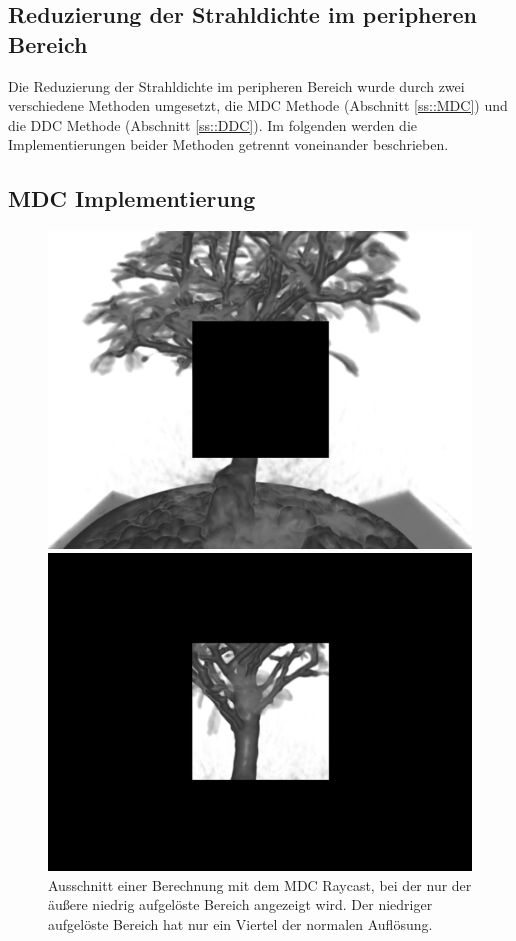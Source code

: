 \subsection{Reduzierung der Strahldichte im peripheren Bereich}
Die Reduzierung der Strahldichte im peripheren Bereich wurde durch zwei verschiedene Methoden umgesetzt, die MDC Methode (Abschnitt \ref{ss::MDC}) und die DDC Methode (Abschnitt \ref{ss::DDC}).
Im folgenden werden die Implementierungen beider Methoden getrennt voneinander beschrieben.

\subsection{MDC Implementierung}
\begin{figure}[]
	\centering
	\begin{minipage}[t]{0.49\textwidth}
		\centering
		\includegraphics[width=1\textwidth]{../../Grafiken/results/implementierung/mdc_ol.png}
		\caption{Ausschnitt einer Berechnung mit dem MDC Raycast, bei der nur der äußere niedrig aufgelöste Bereich angezeigt wird. Der niedriger aufgelöste Bereich hat nur ein Viertel der normalen Auflösung.}
		\label{fig::imp::mdc_ol}
	\end{minipage}
	\hfill
	\begin{minipage}[t]{0.49\textwidth}
		\centering
		\includegraphics[width=1\textwidth]{../../Grafiken/results/implementierung/mdc_il.png}

\end{minipage}
\end{figure}
